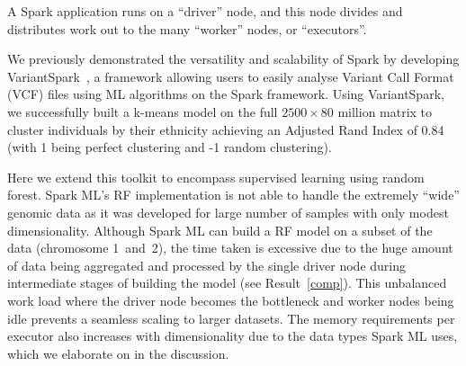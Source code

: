 \documentclass[10pt,a4paper]{article}  %
\newcommand{\cursedforest}{{\sc CursedForest}}
\let\oldmarginpar\marginpar
\renewcommand\marginpar[1]{\-\oldmarginpar[\raggedleft\footnotesize #1]%
{\raggedright\footnotesize #1}}
\begin{document}
A Spark application runs on a ``driver'' node, and this node
divides and distributes work out to the many ``worker'' nodes, or ``executors''.

We previously demonstrated the versatility and scalability of Spark by developing VariantSpark~\cite{OBrien2015}, a
framework allowing users to easily analyse Variant Call Format (VCF) files using ML algorithms on the Spark framework.
Using VariantSpark, we successfully built a k-means model on the full $2500 \times 80$ million matrix to cluster
individuals by their ethnicity achieving an Adjusted Rand Index of 0.84 (with 1 being perfect clustering and -1 random
clustering).

Here we extend this toolkit to encompass supervised learning using random forest.  Spark ML's RF implementation is not
able to handle the extremely ``wide'' genomic data as it was developed for large number of samples with only modest
dimensionality.  Although Spark ML can build a RF model on a subset of the data (chromosome 1~and~2), the time taken is
excessive due to the huge amount of data being aggregated and processed by the single driver node during intermediate
stages of building the model (see Result~\ref{comp}).  This unbalanced work load where the driver node becomes the
bottleneck and worker nodes being idle prevents a seamless scaling to larger datasets. The memory requirements per
executor also increases with dimensionality due to the data types Spark ML uses, which we elaborate on in the
discussion.

 
\end{document}
